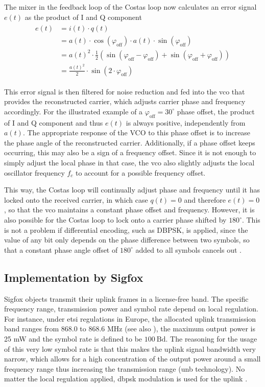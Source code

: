 The mixer in the feedback loop of the Costas loop now calculates an error signal $e(t)$ as the product of I and Q component
\begin{align}
\begin{split}
	e(t)	&= i(t) \cdot q(t) \\
		&= a(t) \cdot \cos(\varphi_\mathrm{off}) \cdot a(t) \cdot \sin(\varphi_\mathrm{off}) \\
		&= a(t)^2 \cdot \frac{1}{2} \left(\sin(\varphi_\mathrm{off} - \varphi_\mathrm{off}) + \sin(\varphi_\mathrm{off} + \varphi_\mathrm{off}) \right) \\
		&= \frac{a(t)^2}{2} \cdot \sin(2 \cdot \varphi_\mathrm{off})
\end{split}
\end{align}

This error signal is then filtered for noise reduction and fed into the \gls{vco} that provides the reconstructed carrier, which adjusts carrier phase and frequency accordingly.
For the illustrated example of a $\varphi_\mathrm{off} = 30^\circ$ phase offset, the product of I and Q component and thus $e(t)$ is always positive, independently from $a(t)$.
The appropriate response of the VCO to this phase offset is to increase the phase angle of the reconstructed carrier.
Additionally, if a phase offset keeps occurring, this may also be a sign of a frequency offset.
Since it is not enough to simply adjust the local phase in that case, the \gls{vco} also slightly adjusts the local oscillator frequency $f_c$ to account for a possible frequency offset.

This way, the Costas loop will continually adjust phase and frequency until it has locked onto the received carrier, in which case $q(t) = 0$ and therefore $e(t) = 0$, so that the \gls{vco} maintains a constant phase offset and frequency.
However, it is also possible for the Costas loop to lock onto a carrier phase shifted by $180^\circ$.
This is not a problem if differential encoding, such as DBPSK, is applied, since the value of any bit only depends on the phase difference between two symbols, so that a constant phase angle offset of $180^\circ$ added to all symbols cancels out \cite[page 11]{costasloops}.

\subsection{Implementation by Sigfox}
Sigfox objects transmit their uplink frames in a license-free band.
The specific frequency range, transmission power and symbol rate depend on local regulation.
For instance, under \gls{etsi} regulations in Europe, the allocated uplink transmission band ranges from 868.0 to 868.6 MHz (see also ), the maximum output power is 25 mW and the symbol rate is defined to be $100 ~ \mathrm{Bd}$.
The reasoning for the usage of this very low symbol rate is that this makes the uplink signal bandwidth very narrow, which allows for a high concentration of the output power around a small frequency range thus increasing the transmission range (\gls{unb} technology).
No matter the local regulation applied, \gls{dbpsk} modulation is used for the uplink \cite{sigfox_ietf}.

